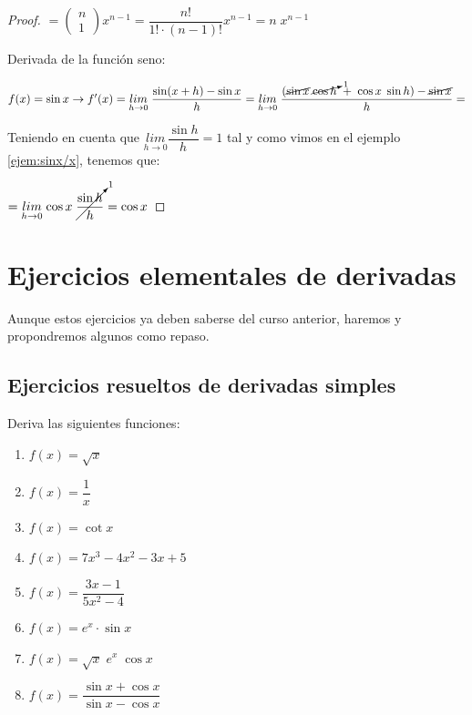 \begin{proof}
	$ = \left( \begin{matrix} n \\ 1 \end{matrix} \right) x^{n-1}= \dfrac {n!}{1!\cdot (n-1)!}x^{n-1}=n\; x^{n-1}$
	
	\vspace{4mm}Derivada de la función seno:
	
	$f(x)=\sin x \to f'(x)=\underset{h\to 0}{lim}\;{\dfrac {\sin(x+h)-\sin x}{h}}=  \underset{h\to 0}{lim}\;{\dfrac {(\cancel{\sin x} \; \cancelto{1}{\cos h} \; + \; \cos x\; \sin h)-\cancel{\sin x}}{h}}=$

	Teniendo en cuenta que $\underset {h\to 0}{lim}{\dfrac {\sin h}{h}}=1$ tal y como vimos en el ejemplo \ref{ejem:sinx/x}, tenemos que:	
	
	$=\underset{h\to 0}{lim}\;{\cos x \; \cancelto{1}{ \dfrac {\sin h}{h}} }=\cos x$
		
	\end{proof}
	
	
		\section{Ejercicios elementales de derivadas}
	
	Aunque estos ejercicios ya deben saberse del curso anterior, haremos y propondremos algunos como repaso.
	
	\subsection{Ejercicios resueltos de derivadas simples}
	
	
	\begin{ejre} Deriva las siguientes funciones:
	
	\begin{multicols}{2}
	
	\begin{enumerate}
		\item $f(x)=\sqrt x$
		\item $f(x)=\dfrac 1 x$
		\item $f(x)=\cot x$
		\item $f(x)=7x^3-4x^2-3x+5$
		\item $f(x)=\dfrac {3x-1}{5x^2-4}$
		\item $f(x)=e^x\cdot \sin x$
		\item $f(x)=\sqrt{x}\; e^x\; \cos x$
		\item $f(x)=\dfrac {\sin x + \cos x}{\sin x - \cos x}$
	\end{enumerate}
		
	\end{multicols}

		
	\end{ejre}
	
